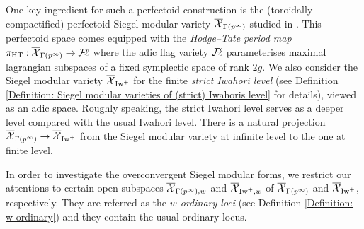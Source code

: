 One key ingredient for such a perfectoid construction is the (toroidally compactified) perfectoid Siegel modular variety $\overline{\operatorname{\mathcal{X}}}_{\Gamma(p^{\infty})}$ studied in \cite{Pilloni-Stroh-CoherentCohomologyandGaloisRepresentations}. This perfectoid space comes equipped with the \emph{Hodge--Tate period map} $\pi_{\operatorname{HT}}: \overline{\operatorname{\mathcal{X}}}_{\Gamma(p^{\infty})}\rightarrow \operatorname{\mathcal{F}\!\mathbf{\ell}}$ where the adic flag variety $\operatorname{\mathcal{F}\!\mathbf{\ell}}$ parameterises maximal lagrangian subspaces of a fixed symplectic space of rank $2g$. We also consider the Siegel modular variety $\overline{\operatorname{\mathcal{X}}}_{\operatorname{Iw}^+}$ for the finite \emph{strict Iwahori level} (see Definition \ref{Definition: Siegel modular varieties of (strict) Iwahoris level} for details), viewed as an adic space. Roughly speaking, the strict Iwahori level serves as a deeper level compared with the usual Iwahori level. There is a natural projection $\overline{\operatorname{\mathcal{X}}}_{\Gamma(p^{\infty})}\rightarrow \overline{\operatorname{\mathcal{X}}}_{\operatorname{Iw}^+}$ from the Siegel modular variety at infinite level to the one at finite level.

In order to investigate the overconvergent Siegel modular forms, we restrict our attentions to certain open subspaces $\overline{\operatorname{\mathcal{X}}}_{\Gamma(p^{\infty}), w}$ and $\overline{\operatorname{\mathcal{X}}}_{\operatorname{Iw}^+, w}$ of $\overline{\operatorname{\mathcal{X}}}_{\Gamma(p^{\infty})}$ and $\overline{\operatorname{\mathcal{X}}}_{\operatorname{Iw}^+}$, respectively. They are referred as the \emph{$w$-ordinary loci} (see Definition \ref{Definition: w-ordinary}) and they contain the usual ordinary locus.

